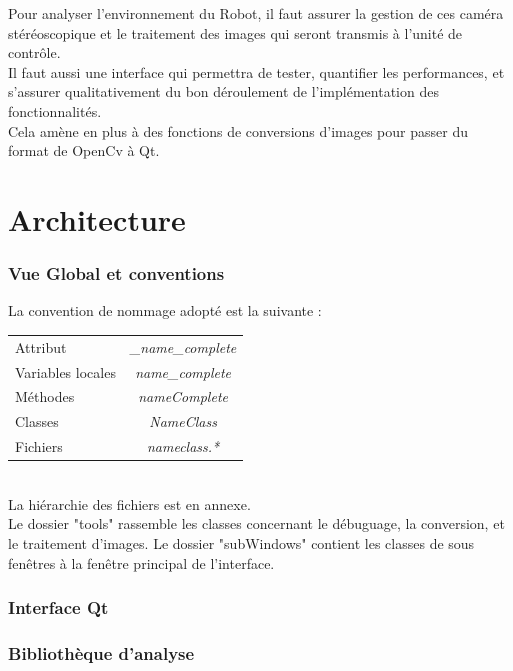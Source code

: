 \documentclass{article}
\begin{document}
Pour analyser l'environnement du Robot, il faut assurer la gestion de ces caméra stéréoscopique et le traitement des images qui seront transmis à l'unité de contrôle.\\

Il faut aussi une interface qui permettra de tester, quantifier les performances, et s'assurer qualitativement du bon déroulement de l'implémentation des fonctionnalités.\\
Cela amène en plus à des fonctions de conversions d'images pour passer du format de OpenCv à Qt. \\

\newpage
\part{Architecture}

\section{Vue Global et conventions}

La convention de nommage adopté est la suivante :\\

\begin{tabular}{ l c }
   Attribut & \textit{\_name\_complete }\\
   Variables locales  & \textit{name\_complete}\\ 
   Méthodes & \textit{nameComplete}\\
   Classes 	& \textit{NameClass}\\
   Fichiers	& \textit{nameclass.*}\\
 \end{tabular}\\

La hiérarchie des fichiers est en annexe.\\
Le dossier "tools" rassemble les classes concernant le débuguage, la conversion, et le traitement d'images.
Le dossier "subWindows" contient les classes de sous fenêtres à la fenêtre principal de l'interface.

\newpage
\section{Interface Qt}


\newpage
\section{Bibliothèque d'analyse}
\end{document}
